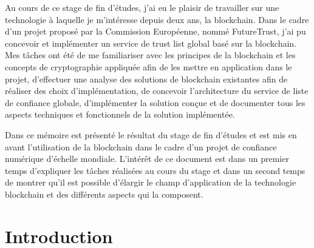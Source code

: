 \documentclass{tnreport}
\begin{document}
Au cours de ce stage de fin d'études, j'ai eu le plaisir de travailler sur une technologie à laquelle je m'intéresse depuis deux ans, la blockchain. Dans le cadre d'un projet proposé par la Commission Européenne, nommé FutureTrust, j'ai pu concevoir et implémenter un service de trust list global basé sur la blockchain. Mes tâches ont été de me familiariser avec les principes de la blockchain et les concepts de cryptographie appliquée afin de les mettre en application dans le projet, d'effectuer une analyse des solutions de blockchain existantes afin de réaliser des choix d'implémentation, de concevoir l'architecture du service de liste de confiance globale, d'implémenter la solution conçue et de documenter tous les aspects techniques et fonctionnels de la solution implémentée.

Dans ce mémoire est présenté le résultat du stage de fin d'études et est mis en avant l'utilisation de la blockchain dans le cadre d'un projet de confiance numérique d'échelle mondiale. L'intérêt de ce document est dans un premier temps d'expliquer les tâches réalisées au cours du stage et dans un second temps de montrer qu'il est possible d'élargir le champ d'application de la technologie blockchain et des différents aspects qui la composent.

\cleardoublepage

\renewcommand{\baselinestretch}{0.5}\normalsize
\tableofcontents
\renewcommand{\baselinestretch}{1.0}\normalsize
\cleardoublepage

\setcounter{page}{1}

\chapter{Introduction}
\end{document}
